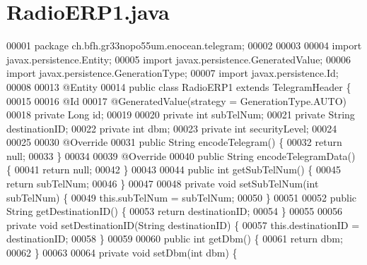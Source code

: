 \section{Radio\+E\+R\+P1.\+java}
\label{RadioERP1_8java_source}

\begin{DoxyCode}
00001 \textcolor{keyword}{package }ch.bfh.gr33nopo55um.enocean.telegram;
00002 
00003 
00004 \textcolor{keyword}{import} javax.persistence.Entity;
00005 \textcolor{keyword}{import} javax.persistence.GeneratedValue;
00006 \textcolor{keyword}{import} javax.persistence.GenerationType;
00007 \textcolor{keyword}{import} javax.persistence.Id;
00008 
00013 @Entity
00014 \textcolor{keyword}{public} \textcolor{keyword}{class }RadioERP1 \textcolor{keyword}{extends} TelegramHeader \{
00015 
00016     @Id
00017     @GeneratedValue(strategy = GenerationType.AUTO)
00018     private Long \textcolor{keywordtype}{id};
00019 
00020     private \textcolor{keywordtype}{int} subTelNum;
00021     private String destinationID;
00022     private \textcolor{keywordtype}{int} dbm;
00023     private \textcolor{keywordtype}{int} securityLevel;
00024 
00025 
00030     @Override
00031     public String encodeTelegram() \{
00032         \textcolor{keywordflow}{return} null;
00033     \}
00034 
00039     @Override
00040     \textcolor{keyword}{public} String encodeTelegramData() \{
00041         \textcolor{keywordflow}{return} null;
00042     \}
00043 
00044     \textcolor{keyword}{public} \textcolor{keywordtype}{int} getSubTelNum() \{
00045         \textcolor{keywordflow}{return} subTelNum;
00046     \}
00047 
00048     \textcolor{keyword}{private} \textcolor{keywordtype}{void} setSubTelNum(\textcolor{keywordtype}{int} subTelNum) \{
00049         this.subTelNum = subTelNum;
00050     \}
00051 
00052     \textcolor{keyword}{public} String getDestinationID() \{
00053         \textcolor{keywordflow}{return} destinationID;
00054     \}
00055 
00056     \textcolor{keyword}{private} \textcolor{keywordtype}{void} setDestinationID(String destinationID) \{
00057         this.destinationID = destinationID;
00058     \}
00059 
00060     \textcolor{keyword}{public} \textcolor{keywordtype}{int} getDbm() \{
00061         \textcolor{keywordflow}{return} dbm;
00062     \}
00063 
00064     \textcolor{keyword}{private} \textcolor{keywordtype}{void} setDbm(\textcolor{keywordtype}{int} dbm) \{

\end{DoxyCode}
